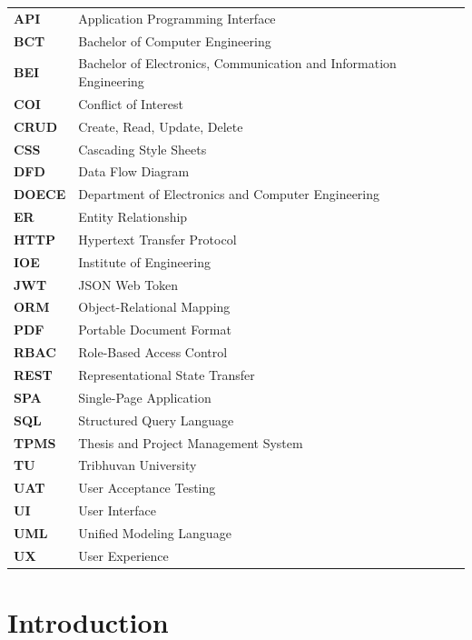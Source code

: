 \documentclass[12pt,a4paper]{report}
\begin{document}
\begin{tabular}{@{}l l@{}}
\textbf{API}   & Application Programming Interface \\
\textbf{BCT}   & Bachelor of Computer Engineering \\
\textbf{BEI}   & Bachelor of Electronics, Communication and Information Engineering \\
\textbf{COI}   & Conflict of Interest \\
\textbf{CRUD}  & Create, Read, Update, Delete \\
\textbf{CSS}   & Cascading Style Sheets \\
\textbf{DFD}   & Data Flow Diagram \\
\textbf{DOECE} & Department of Electronics and Computer Engineering \\
\textbf{ER}    & Entity Relationship \\
\textbf{HTTP}  & Hypertext Transfer Protocol \\
\textbf{IOE}   & Institute of Engineering \\
\textbf{JWT}   & JSON Web Token \\
\textbf{ORM}   & Object-Relational Mapping \\
\textbf{PDF}   & Portable Document Format \\
\textbf{RBAC}  & Role-Based Access Control \\
\textbf{REST}  & Representational State Transfer \\
\textbf{SPA}   & Single-Page Application \\
\textbf{SQL}   & Structured Query Language \\
\textbf{TPMS}  & Thesis and Project Management System \\
\textbf{TU}    & Tribhuvan University \\
\textbf{UAT}   & User Acceptance Testing \\
\textbf{UI}    & User Interface \\
\textbf{UML}   & Unified Modeling Language \\
\textbf{UX}    & User Experience \\
\end{tabular}

\pagestyle{mainpages}
\setcounter{page}{1}

\chapter{Introduction}
\end{document}

